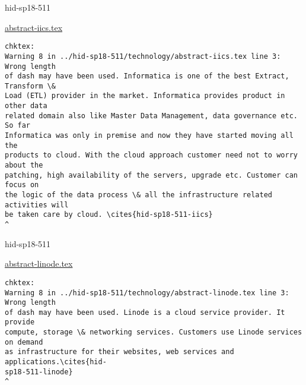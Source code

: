 

\begin{IU}

hid-sp18-511

\href{https://github.com/cloudmesh-community/hid-sp18-511/blob/master//technology/abstract-iics.tex}{abstract-iics.tex}

\begin{tiny}
\begin{verbatim}
chktex:
Warning 8 in ../hid-sp18-511/technology/abstract-iics.tex line 3: Wrong length
of dash may have been used. Informatica is one of the best Extract, Transform \&
Load (ETL) provider in the market. Informatica provides product in other data
related domain also like Master Data Management, data governance etc. So far
Informatica was only in premise and now they have started moving all the
products to cloud. With the cloud approach customer need not to worry about the
patching, high availability of the servers, upgrade etc. Customer can focus on
the logic of the data process \& all the infrastructure related activities will
be taken care by cloud. \cites{hid-sp18-511-iics}
^
\end{verbatim}
\end{tiny}
\end{IU}



\begin{IU}

hid-sp18-511

\href{https://github.com/cloudmesh-community/hid-sp18-511/blob/master//technology/abstract-linode.tex}{abstract-linode.tex}

\begin{tiny}
\begin{verbatim}
chktex:
Warning 8 in ../hid-sp18-511/technology/abstract-linode.tex line 3: Wrong length
of dash may have been used. Linode is a cloud service provider. It provide
compute, storage \& networking services. Customers use Linode services on demand
as infrastructure for their websites, web services and applications.\cites{hid-
sp18-511-linode}
^
\end{verbatim}
\end{tiny}
\end{IU}



